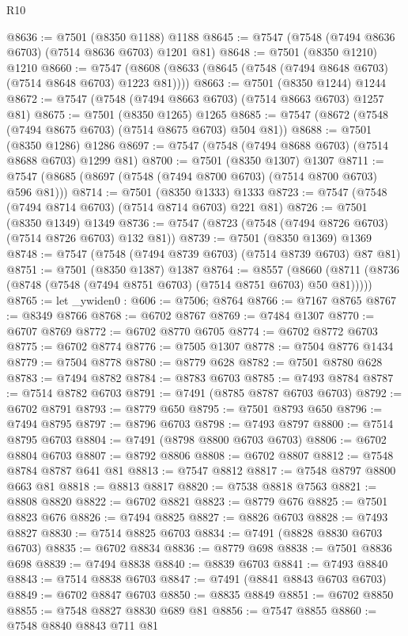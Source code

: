 \begin{lexlean}{R10}
\begin{coremodule}
@8636 := @7501 (@8350 @1188) @1188
@8645 := @7547 (@7548 (@7494 @8636 @6703) (@7514 @8636 @6703) @1201 @81)
@8648 := @7501 (@8350 @1210) @1210
@8660 := @7547 (@8608 (@8633 (@8645 (@7548 (@7494 @8648 @6703) (@7514 @8648 @6703) @1223 @81))))
@8663 := @7501 (@8350 @1244) @1244
@8672 := @7547 (@7548 (@7494 @8663 @6703) (@7514 @8663 @6703) @1257 @81)
@8675 := @7501 (@8350 @1265) @1265
@8685 := @7547 (@8672 (@7548 (@7494 @8675 @6703) (@7514 @8675 @6703) @504 @81))
@8688 := @7501 (@8350 @1286) @1286
@8697 := @7547 (@7548 (@7494 @8688 @6703) (@7514 @8688 @6703) @1299 @81)
@8700 := @7501 (@8350 @1307) @1307
@8711 := @7547 (@8685 (@8697 (@7548 (@7494 @8700 @6703) (@7514 @8700 @6703) @596 @81)))
@8714 := @7501 (@8350 @1333) @1333
@8723 := @7547 (@7548 (@7494 @8714 @6703) (@7514 @8714 @6703) @221 @81)
@8726 := @7501 (@8350 @1349) @1349
@8736 := @7547 (@8723 (@7548 (@7494 @8726 @6703) (@7514 @8726 @6703) @132 @81))
@8739 := @7501 (@8350 @1369) @1369
@8748 := @7547 (@7548 (@7494 @8739 @6703) (@7514 @8739 @6703) @87 @81)
@8751 := @7501 (@8350 @1387) @1387
@8764 := @8557
    (@8660 (@8711 (@8736 (@8748 (@7548 (@7494 @8751 @6703) (@7514 @8751 @6703) @50 @81)))))
@8765 := let _ywiden0 : @606 := @7506; @8764
@8766 := @7167 @8765
@8767 := @8349 @8766
@8768 := @6702 @8767
@8769 := @7484 @1307
@8770 := @6707 @8769
@8772 := @6702 @8770 @6705
@8774 := @6702 @8772 @6703
@8775 := @6702 @8774
@8776 := @7505 @1307
@8778 := @7504 @8776 @1434
@8779 := @7504 @8778
@8780 := @8779 @628
@8782 := @7501 @8780 @628
@8783 := @7494 @8782
@8784 := @8783 @6703
@8785 := @7493 @8784
@8787 := @7514 @8782 @6703
@8791 := @7491 (@8785 @8787 @6703 @6703)
@8792 := @6702 @8791
@8793 := @8779 @650
@8795 := @7501 @8793 @650
@8796 := @7494 @8795
@8797 := @8796 @6703
@8798 := @7493 @8797
@8800 := @7514 @8795 @6703
@8804 := @7491 (@8798 @8800 @6703 @6703)
@8806 := @6702 @8804 @6703
@8807 := @8792 @8806
@8808 := @6702 @8807
@8812 := @7548 @8784 @8787 @641 @81
@8813 := @7547 @8812
@8817 := @7548 @8797 @8800 @663 @81
@8818 := @8813 @8817
@8820 := @7538 @8818 @7563
@8821 := @8808 @8820
@8822 := @6702 @8821
@8823 := @8779 @676
@8825 := @7501 @8823 @676
@8826 := @7494 @8825
@8827 := @8826 @6703
@8828 := @7493 @8827
@8830 := @7514 @8825 @6703
@8834 := @7491 (@8828 @8830 @6703 @6703)
@8835 := @6702 @8834
@8836 := @8779 @698
@8838 := @7501 @8836 @698
@8839 := @7494 @8838
@8840 := @8839 @6703
@8841 := @7493 @8840
@8843 := @7514 @8838 @6703
@8847 := @7491 (@8841 @8843 @6703 @6703)
@8849 := @6702 @8847 @6703
@8850 := @8835 @8849
@8851 := @6702 @8850
@8855 := @7548 @8827 @8830 @689 @81
@8856 := @7547 @8855
@8860 := @7548 @8840 @8843 @711 @81

\end{coremodule}
\end{lexlean}
